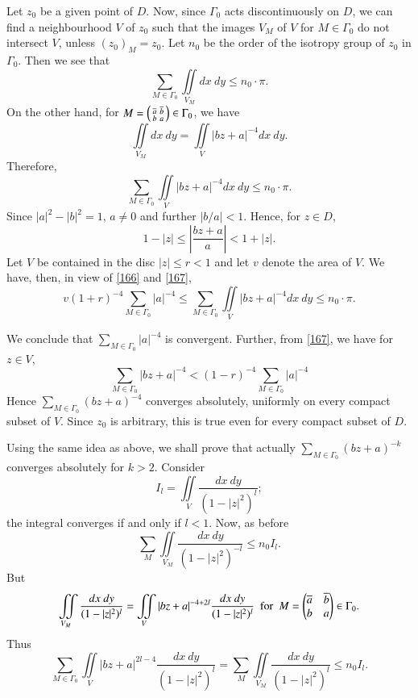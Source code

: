 Let $z_{0}$ be a given point of $D$. Now, since $\Gamma_{0}$ acts
discontinuously on $D$, we can find a neighbourhood $V$ of $z_{0}$
such that the images $V_{M}$ of $V$ for $M\in \Gamma_{0}$ do not
intersect $V$, unless $(z_{0})_{M}=z_{0}$. Let $n_{0}$ be the order of
the isotropy group of $z_{0}$ in $\Gamma_{0}$. Then we see that
$$
\sum_{M\in\Gamma_{0}}\iint\limits_{V_{M}}dx\ dy\leq n_{0}\cdot \pi.
$$
On the other hand, for $M=\left(\begin{smallmatrix} \overline{a} &
  \overline{b}\\ b & a\end{smallmatrix}\right)\in\Gamma_{0}$, we have
$$
\iint\limits_{V_{M}}dx\ dy =\iint\limits_{V}|bz+a|^{-4}dx\ dy.
$$
Therefore,\pageoriginale
\begin{equation*}
\sum_{M\in\Gamma_{0}}\iint\limits_{V}|bz+a|^{-4}dx\ dy\leq n_{0}\cdot
\pi.\tag{166}\label{166} 
\end{equation*}
Since $|a|^{2}-|b|^{2}=1$, $a\neq 0$ and further $|b/a|<1$. Hence, for
$z\in D$,
\begin{equation*}
1-|z|\leq \left|\frac{bz+a}{a}\right|<1+|z|.\tag{167}\label{167}
\end{equation*}
Let $V$ be contained in the disc $|z|\leq r<1$ and let $v$ denote the
area of $V$. We have, then, in view of \eqref{166} and \eqref{167},
\begin{equation*}
v(1+r)^{-4}\sum_{M\in\Gamma_{0}}|a|^{-4}\leq
\sum_{M\in\Gamma_{0}}\iint\limits_{V} |bz+a|^{-4}dx\ dy\leq n_{0}\cdot
\pi.\tag{168}\label{168} 
\end{equation*}

We conclude that $\sum\limits_{M\in\Gamma_{0}}|a|^{-4}$ is
convergent. Further, from \eqref{167}, we have for $z\in V$,
$$
\sum_{M\in\Gamma_{0}}|bz+a|^{-4}<(1-r)^{-4}\sum_{M\in\Gamma_{0}}|a|^{-4}
$$
Hence $\sum\limits_{M\in\Gamma_{0}}(bz+a)^{-4}$ converges absolutely,
uniformly on every compact subset of $V$. Since $z_{0}$ is arbitrary,
this is true even for every compact subset of $D$.

Using the same idea as above, we shall prove that actually
$\sum\limits_{M\in\Gamma_{0}}(bz+a)^{-k}$ converges absolutely for
$k>2$. Consider
$$
I_{l}=\iint\limits_{V}\frac{dx\ dy}{(1-|z|^{2})^{l}};
$$
the integral converges if and only if $l<1$. Now, as before
$$
\sum_{M}\iint\limits_{V_{M}}\frac{dx\ dy}{(1-|z|^{2})^{-l}}\leq
n_{0}I_{l}. 
$$
But 
$$
\iint\limits_{V_{M}}\frac{dx\ dy}{(1-|z|^{2})^{l}}=\iint\limits_{V}|bz+a|^{-4+2l}\frac{dx\ dy}{(1-|z|^{2})^{l}}\text{ 
  \  for \ } M=
\begin{pmatrix}
\ob{a} & \ob{b}\\
b & a
\end{pmatrix}
\in\Gamma_{0}.
$$
Thus\pageoriginale
$$
\sum_{M\in\Gamma_{0}}\iint\limits_{V}|bz+a|^{2l-4}\frac{dx\ dy}{(1-|z|^{2})^{l}}=\sum_{M}\iint\limits_{V_{M}}\frac{dx\ dy}{(1-|z|^{2})^{l}}\leq
n_{0}I_{l}. 
$$

